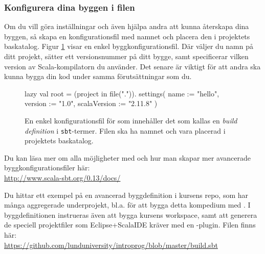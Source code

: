 \subsubsection{Konfigurera dina byggen i filen }

Om du vill göra inställningar och även hjälpa andra att kunna återskapa dina byggen, så skapa en konfigurationsfil med namnet  och placera den i projektets baskatalog. Figur \ref{fig:sbt:build-file} visar en enkel byggkonfigurationsfil. Där väljer du namn på ditt projekt, sätter ett versionsnummer på ditt bygge, samt specificerar vilken version av Scala-kompilatorn du använder. Det senare är viktigt för att andra ska kunna bygga din kod under samma förutsättningar som du. 

\begin{figure}[H]
\centering
\begin{Code}
lazy val root = (project in file(".")).
  settings(
    name := "hello",
    version := "1.0",
    scalaVersion := "2.11.8"
  )
\end{Code}
\caption{En enkel konfigurationsfil för \sbt som innehåller det som kallas en \textit{build definition} i \texttt{sbt}-termer. Filen ska ha namnet  och vara placerad i projektets baskatalog.}
\label{fig:sbt:build-file}
\end{figure}

\noindent Du kan läsa mer om alla möjligheter med \sbt och hur man skapar mer avancerade byggkonfigurationsfiler här: \\
\url{http://www.scala-sbt.org/0.13/docs/}

Du hittar ett exempel på en avancerad byggdefinition i kursens repo, som har många aggregerade underprojekt, bl.a. för att bygga detta kompedium med . I byggdefinitionen instrueras även \sbt att bygga kursens workspace, samt att generera de speciell projektfiler som Eclipse+ScalaIDE kräver med en \sbt-plugin. Filen finns här: \\
\url{https://github.com/lunduniversity/introprog/blob/master/build.sbt}


